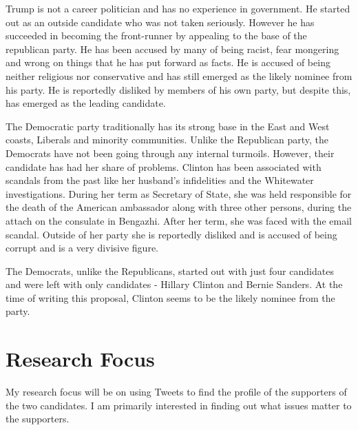 \documentclass{sig-alternate-05-2015}
\begin{document}
Trump is not a career politician and has no experience in government. He started out as an outside candidate who was not taken seriously. However he has succeeded in becoming the front-runner by appealing to the base of the republican party. He has been accused by many of being racist, fear mongering and wrong on things that he has put forward as facts. He is accused of being neither religious nor conservative and has still emerged as the likely nominee from his party. He is reportedly disliked by members of his own party, but despite this, has emerged as the leading candidate.

The Democratic party traditionally has its strong base in the East and West coasts, Liberals and minority communities. Unlike the Republican party, the Democrats have not been going through any internal turmoils. However, their candidate has had her share of problems. Clinton has been associated with scandals from the past like her husband's infidelities and the Whitewater investigations. During her term as Secretary of State, she was held responsible for the death of the American ambassador along with three other persons, during the attach on the consulate in Bengazhi. After her term, she was faced with the email scandal. Outside of her party she is reportedly disliked and is accused of being corrupt and is a very divisive figure.

The Democrats, unlike the Republicans, started out with just four candidates and were left with only candidates - Hillary Clinton and Bernie Sanders. At the time of writing this proposal, Clinton seems to be the likely nominee from the party.

\section{Research Focus}

My research focus will be on using Tweets to find the profile of the supporters of the two candidates. I am primarily interested in finding out what issues matter to the supporters. 
\end{document}
